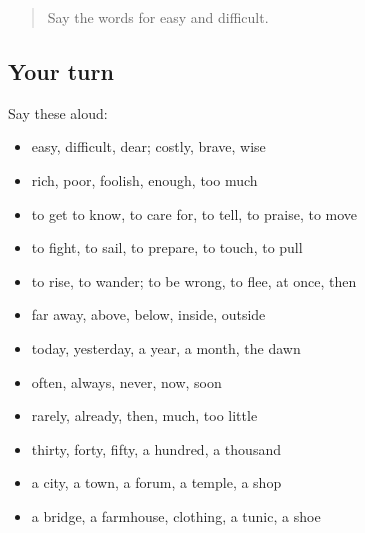 \begin{quote}
Say the words for easy and difficult.
\end{quote}

\subsection*{Your turn}
Say these aloud:

\begin{itemize}
\raggedright
  \item easy, difficult, dear; costly, brave, wise
  \item rich, poor, foolish, enough, too much
  \item to get to know, to care for, to tell, to praise, to move
  \item to fight, to sail, to prepare, to touch, to pull
  \item to rise, to wander; to be wrong, to flee, at once, then
  \item far away, above, below, inside, outside
  \item today, yesterday, a year, a month, the dawn
  \item often, always, never, now, soon
  \item rarely, already, then, much, too little
  \item thirty, forty, fifty, a hundred, a thousand
  \item a city, a town, a forum, a temple, a shop
  \item a bridge, a farmhouse, clothing, a tunic, a shoe
\end{itemize}

